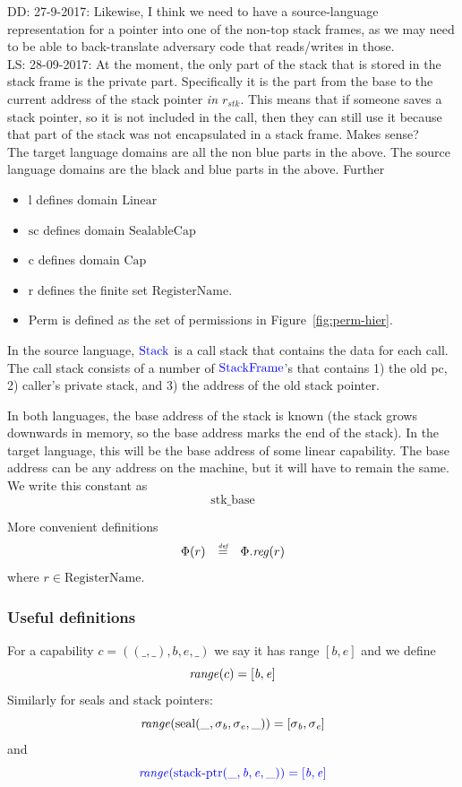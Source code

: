 \documentclass[a3paper]{article}
\newcommand\lau[1]{{\color{purple} \sf \footnotesize {LS: #1}}\\}
\newcommand\dominique[1]{{\color{purple} \sf \footnotesize {DD: #1}}\\}
\newcommand{\defeq}{\stackrel{\textit{\tiny{def}}}{=}}
\newcommand{\sourcecolor}{\color{blue}}
\newcommand{\src}[1]{{\sourcecolor #1}}
\newcommand{\shareddom}[1]{\mathrm{#1}}
\newcommand{\RegName}{\shareddom{RegisterName}}
\newcommand{\Perm}{\shareddom{Perm}}
\newcommand{\Caps}{\shareddom{Cap}}
\newcommand{\SealableCaps}{\shareddom{SealableCap}}
\newcommand{\Linear}{\shareddom{Linear}}
\newcommand{\StkFrame}{\shareddom{StackFrame}}
\newcommand{\Stack}{\shareddom{Stack}}
\newcommand{\scbnf}{\shareddom{sc}}
\newcommand{\cbnf}{\shareddom{c}}
\newcommand{\rbnf}{\shareddom{r}}
\newcommand{\linbnf}{\shareddom{l}}
\newcommand{\stkptr}[1]{\mathrm{stack\text{-}ptr}(#1)}
\newcommand{\seal}[1]{\shareddom{seal}(#1)}
\newcommand{\var}[1]{\mathit{#1}}
\newcommand{\reg}{\var{reg}}
\newcommand{\stk}{\var{stk}}
\newcommand{\baddr}{\var{b}}
\newcommand{\eaddr}{\var{e}}
\newcommand{\constant}[1]{\mathrm{#1}}
\newcommand{\stkb}{\constant{stk\_base}}
\newcommand{\plainfun}[2]{
  \ifthenelse{\equal{#2}{}}
  {\mathit{#1}}
  {\mathit{#1}(#2)}
}
\newcommand{\range}[1]{\plainfun{range}{#1}}
\begin{document}
\dominique{27-9-2017: Likewise, I think we need to have a source-language representation for a pointer into one of the non-top stack frames, as we may need to be able to back-translate adversary code that reads/writes in those.}
\lau{28-09-2017: At the moment, the only part of the stack that is stored in the stack frame is the private part. Specifically it is the part from the base to the current address of the stack pointer \emph{in $r_\stk$}. This means that if someone saves a stack pointer, so it is not included in the call, then they can still use it because that part of the stack was not encapsulated in a stack frame. Makes sense?}
The target language domains are all the non blue parts in the above. The source language domains are the black and blue parts in the above. Further
\begin{itemize}
\item $\linbnf$ defines domain $\Linear$
\item $\scbnf$ defines domain $\SealableCaps$
\item $\cbnf$ defines domain $\Caps$
\item $\rbnf$ defines the finite set $\RegName$.
\item $\Perm$ is defined as the set of permissions in Figure~\ref{fig:perm-hier}.
\end{itemize}

In the source language, $\src{\Stack}$ is a call stack that contains the data for each call. The call stack consists of a number of $\src{\StkFrame}$'s that contains 1) the old pc, 2) caller's private stack, and 3) the address of the old stack pointer. 

 In both languages, the base address of the stack is known (the stack grows downwards in memory, so the base address marks the end of the stack). In the target language, this will be the base address of some linear capability. The base address can be any address on the machine, but it will have to remain the same. We write this constant as
\[
  \stkb
\]

More convenient definitions
\[
  \begin{array}{rcl}
    \Phi(r) & \defeq & \Phi.\reg(r)
  \end{array}
\]
where $r\in \RegName$.

\subsubsection{Useful definitions}
\begin{definition}
  For a capability $c=((\_,\_),\baddr,\eaddr,\_)$ we say it has range $[\baddr,\eaddr]$ and we define
  \[
    \range{c} = [\baddr,\eaddr]
  \]
  Similarly for seals and stack pointers:
  \[
    \range{\seal{\_,\sigma_\baddr,\sigma_\eaddr,\_}} = [\sigma_\baddr,\sigma_\eaddr]
  \]
  and
  \[
    \src{\range{\stkptr{\_,\baddr,\eaddr,\_}} = [\baddr,\eaddr]}
  \]
\end{definition}
\end{document}
